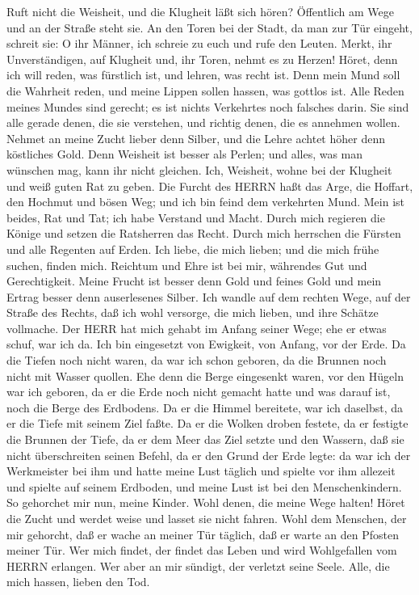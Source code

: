  Ruft nicht die Weisheit, und die Klugheit läßt sich hören?
 Öffentlich am Wege und an der Straße steht sie.
 An den Toren bei der Stadt, da man zur Tür eingeht, schreit
sie:  O ihr Männer, ich schreie zu euch und rufe den Leuten.
 Merkt, ihr Unverständigen, auf Klugheit und, ihr Toren,
nehmt es zu Herzen!  Höret, denn ich will reden, was
fürstlich ist, und lehren, was recht ist.  Denn mein Mund
soll die Wahrheit reden, und meine Lippen sollen hassen, was gottlos
ist.  Alle Reden meines Mundes sind gerecht; es ist nichts
Verkehrtes noch falsches darin.  Sie sind alle gerade denen,
die sie verstehen, und richtig denen, die es annehmen wollen.
 Nehmet an meine Zucht lieber denn Silber, und die Lehre
achtet höher denn köstliches Gold.  Denn Weisheit ist
besser als Perlen; und alles, was man wünschen mag, kann ihr nicht
gleichen.  Ich, Weisheit, wohne bei der Klugheit und weiß
guten Rat zu geben.  Die Furcht des HERRN haßt das Arge,
die Hoffart, den Hochmut und bösen Weg; und ich bin feind dem verkehrten
Mund.  Mein ist beides, Rat und Tat; ich habe Verstand und
Macht.  Durch mich regieren die Könige und setzen die
Ratsherren das Recht.  Durch mich herrschen die Fürsten und
alle Regenten auf Erden.  Ich liebe, die mich lieben; und
die mich frühe suchen, finden mich.  Reichtum und Ehre ist
bei mir, währendes Gut und Gerechtigkeit.  Meine Frucht ist
besser denn Gold und feines Gold und mein Ertrag besser denn
auserlesenes Silber.  Ich wandle auf dem rechten Wege, auf
der Straße des Rechts,  daß ich wohl versorge, die mich
lieben, und ihre Schätze vollmache.  Der HERR hat mich
gehabt im Anfang seiner Wege; ehe er etwas schuf, war ich da.
 Ich bin eingesetzt von Ewigkeit, von Anfang, vor der Erde.
 Da die Tiefen noch nicht waren, da war ich schon geboren,
da die Brunnen noch nicht mit Wasser quollen.  Ehe denn die
Berge eingesenkt waren, vor den Hügeln war ich geboren,  da
er die Erde noch nicht gemacht hatte und was darauf ist, noch die Berge
des Erdbodens.  Da er die Himmel bereitete, war ich
daselbst, da er die Tiefe mit seinem Ziel faßte.  Da er die
Wolken droben festete, da er festigte die Brunnen der Tiefe,
 da er dem Meer das Ziel setzte und den Wassern, daß sie
nicht überschreiten seinen Befehl, da er den Grund der Erde legte:
 da war ich der Werkmeister bei ihm und hatte meine Lust
täglich und spielte vor ihm allezeit  und spielte auf
seinem Erdboden, und meine Lust ist bei den Menschenkindern.
 So gehorchet mir nun, meine Kinder. Wohl denen, die meine
Wege halten!  Höret die Zucht und werdet weise und lasset
sie nicht fahren.  Wohl dem Menschen, der mir gehorcht, daß
er wache an meiner Tür täglich, daß er warte an den Pfosten meiner Tür.
 Wer mich findet, der findet das Leben und wird
Wohlgefallen vom HERRN erlangen.  Wer aber an mir sündigt,
der verletzt seine Seele. Alle, die mich hassen, lieben den Tod.

